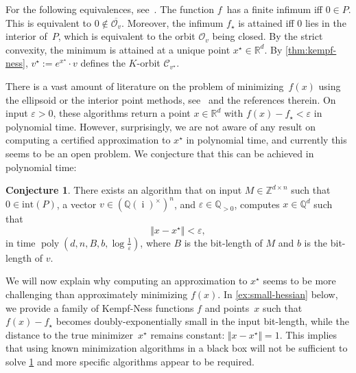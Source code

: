 \documentclass[10pt,a4paper]{article}
\theoremstyle{definition}
\newtheorem{openproblem}[theorem]{Conjecture}\crefname{openproblem}{Conjecture}{Conjectures}
\DeclareMathOperator{\poly}{poly}
\DeclareMathOperator{\ii}{i}
\newcommand{\QQ}{\mathbb{Q}}
\newcommand{\ZZ}{\mathbb{Z}}
\newcommand{\RR}{\mathbb{R}}
\newcommand{\OO}{\ensuremath{\mathcal{O}}}
\newcommand{\KK}{\ensuremath{\mathcal{C}}}
\numberwithin{equation}{section}
\begin{document}
For the following equivalences, see~\cite{BLNW:20,torus}.
The function $f$~has a finite infimum iff $0\in P$.
This is equivalent to $0 \not\in\overline{\OO_v}$.
Moreover, the infimum $f_\star$ is attained iff $0$ lies in the interior of~$P$,
which is equivalent to the orbit $\OO_v$ being closed.
By the strict convexity, the minimum is attained at a unique point $x^\star\in\RR^d$.
By \cref{thm:kempf-ness},
$v^\star := e^{x^\star}\cdot v$
defines the $K$-orbit $\KK_{v^\star}$.

There is a vast amount of literature on the problem of minimizing~$f(x)$
using the ellipsoid or the interior point methods,
see~\cite{BLNW:20, geomet-tut,nemirovski-ellipsoid, vishnoi-singh, vishnoi-straszak, leake-vishnoi} and the references therein.
On input $\varepsilon>0$, these algorithms return a point $x\in\RR^d$ with $f(x)-f_\star<\varepsilon$ in polynomial time.
However, surprisingly, we are not aware of any result on computing a certified approximation to $x^\star$ in polynomial time, and currently this seems to be an open problem.
We conjecture that this can be achieved in polynomial time:

\begin{openproblem}
\label{conj:optimal}
	There exists an algorithm that on input $M\in\ZZ^{d\times n}$ such that $0\in\mathrm{int}(P)$, a vector $v\in(\QQ(\ii)^\times)^n$, and $\varepsilon\in\QQ_{>0}$, computes $x\in\QQ^d$ such that \[
	\Vert x-x^\star\Vert < \varepsilon,
	\] in time $\poly(d,n,B,b,\log\frac{1}{\varepsilon})$, where $B$ is the bit-length of $M$ and $b$ is the bit-length of $v$.
\end{openproblem}

We will now explain why computing an approximation to $x^\star$ seems to be more challenging than approximately minimizing $f(x)$.
In \cref{ex:small-hessian} below, we provide a family of Kempf-Ness functions $f$ and points~$x$ such that $f(x)-f_\star$ becomes doubly-exponentially small in the input bit-length, while the distance to the true minimizer~$x^\star$ remains constant: $\Vert x-x^\star\Vert=1$.
This implies that using known minimization algorithms in a black box will not be sufficient to solve \cref{conj:optimal} and more specific algorithms appear to be required.
\end{document}
